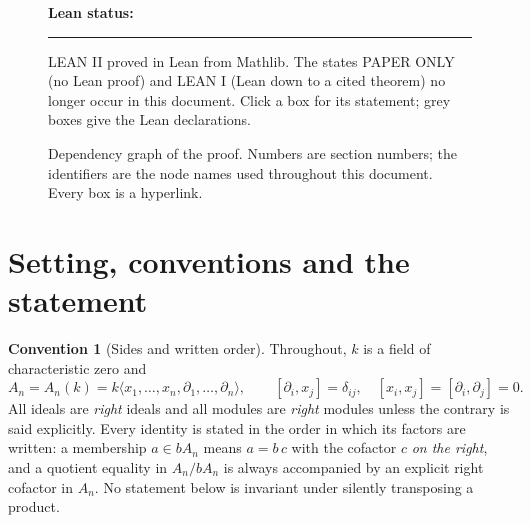 \documentclass[11pt]{article}
\theoremstyle{plain}
\theoremstyle{definition}
\newtheorem{convention}[theorem]{Convention}
\theoremstyle{remark}
\theoremstyle{plain}
\begin{document}
\begin{figure}[h!]

\vspace{0.5ex}
{\footnotesize\sffamily
\textbf{Lean status:}\quad
\textcolor{cphaseii}{\rule{1.2ex}{1.2ex}} \textsf{LEAN II} proved in Lean from
Mathlib. The states \textsf{PAPER ONLY} (no Lean proof) and \textsf{LEAN I}
(Lean down to a cited theorem) no longer occur in this document.
Click a box for its statement; grey boxes give the Lean declarations.}

\caption{Dependency graph of the proof. Numbers are section numbers; the
identifiers are the node names used throughout this document. Every box is a
hyperlink.}
\label{fig:map}
\end{figure}

\clearpage

\setcounter{section}{-1}
\section{Setting, conventions and the statement}\label{sec:setting}

\begin{convention}[Sides and written order]\label{conv:sides}
Throughout, $k$ is a field of characteristic zero and
\[
  A_n=A_n(k)=k\langle x_1,\dots,x_n,\partial_1,\dots,\partial_n\rangle,
  \qquad [\partial_i,x_j]=\delta_{ij},\quad [x_i,x_j]=[\partial_i,\partial_j]=0 .
\]
All ideals are \emph{right} ideals and all modules are \emph{right} modules
unless the contrary is said explicitly. Every identity is stated in the order
in which its factors are written: a membership $a\in bA_n$ means
$a=b\,c$ with the cofactor $c$ \emph{on the right}, and a quotient equality in
$A_n/bA_n$ is always accompanied by an explicit right cofactor in $A_n$. No
statement below is invariant under silently transposing a product.
\end{convention}
\end{document}
